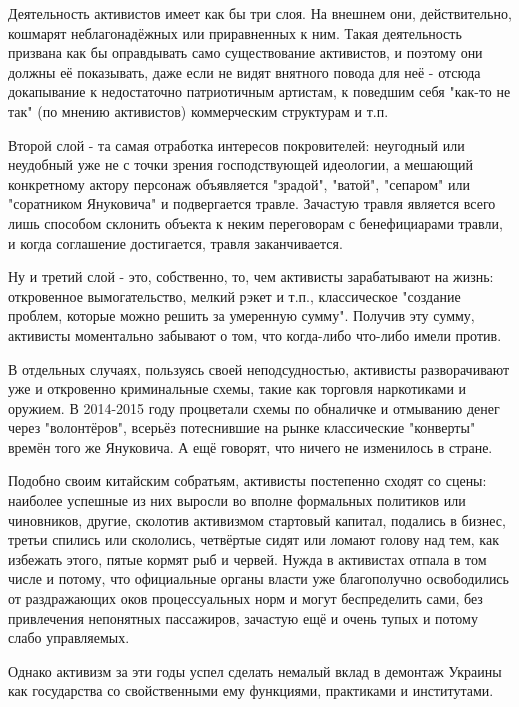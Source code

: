Деятельность активистов имеет как бы три слоя. На внешнем они, действительно,
кошмарят неблагонадёжных или приравненных к ним. Такая деятельность призвана
как бы оправдывать само существование активистов, и поэтому они должны её
показывать, даже если не видят внятного повода для неё - отсюда докапывание к
недостаточно патриотичным артистам, к поведшим себя "как-то не так" (по мнению
активистов) коммерческим структурам и т.п.

Второй слой - та самая отработка интересов покровителей: неугодный или
неудобный уже не с точки зрения господствующей идеологии, а мешающий
конкретному актору персонаж объявляется "зрадой", "ватой", "сепаром" или
"соратником Януковича" и подвергается травле. Зачастую травля является всего
лишь способом склонить объекта к неким переговорам с бенефициарами травли, и
когда соглашение достигается, травля заканчивается.

Ну и третий слой - это, собственно, то, чем активисты зарабатывают на жизнь:
откровенное вымогательство, мелкий рэкет и т.п., классическое "создание
проблем, которые можно решить за умеренную сумму". Получив эту сумму, активисты
моментально забывают о том, что когда-либо что-либо имели против. 

В отдельных случаях, пользуясь своей неподсудностью, активисты разворачивают
уже и откровенно криминальные схемы, такие как торговля наркотиками и оружием.
В 2014-2015 году процветали схемы по обналичке и отмыванию денег через
"волонтёров", всерьёз потеснившие на рынке классические "конверты" времён того
же Януковича. А ещё говорят, что ничего не изменилось в стране.

Подобно своим китайским собратьям, активисты постепенно сходят со сцены:
наиболее успешные из них выросли во вполне формальных политиков или чиновников,
другие, сколотив активизмом стартовый капитал, подались в бизнес, третьи
спились или скололись, четвёртые сидят или ломают голову над тем, как избежать
этого, пятые кормят рыб и червей. Нужда в активистах отпала в том числе и
потому, что официальные органы власти уже благополучно освободились от
раздражающих оков процессуальных норм и могут беспределить сами, без
привлечения непонятных пассажиров, зачастую ещё и очень тупых и потому слабо
управляемых.

Однако активизм за эти годы успел сделать немалый вклад в демонтаж Украины как
государства со свойственными ему функциями, практиками и институтами.
